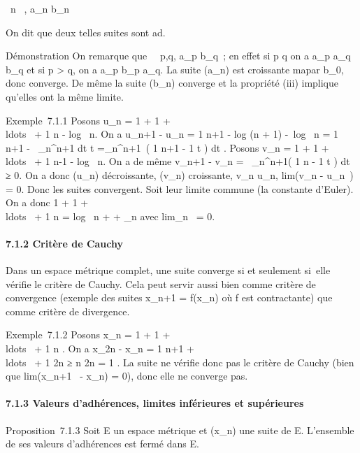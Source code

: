 \documentclass[]{article}
\begin{document}
\forall~n \in {}~, a\_n \leq \ell \leq b\_n~

On dit que deux telles suites sont ad\jmathacentes.

Démonstration On remarque que \forall~~p,q,
a\_p \leq b\_q~; en effet si p \leq q on a a\_p \leq
a\_q \leq b\_q et si p \textgreater{} q, on a a\_p
\leq b\_p \leq a\_q. La suite (a\_n) est croissante
ma par b\_0, donc converge. De même la suite (b\_n)
converge et la propriété (iii) implique qu'elles ont la même limite.

Exemple~7.1.1 Posons u\_n = 1 + 1  +
\\ldots~ + 1
\over n - log~ n. On a
u\_n+1 - u\_n = 1 \over n+1
- log (n + 1) -\ log~
n = 1 \over n+1 -\int ~
\_n^n+1 dt \over t
=\int  \_n^n+1~( 1
\over n+1 - 1 \over t ) dt .
Posons v\_n = 1 + 1  +
\\ldots~ + 1
\over n-1 - log~ n. On a de
même v\_n+1 - v\_n =\int ~
\_n^n+1( 1 \over n - 1
\over t ) dt ≥ 0. On a donc (u\_n)
décroissante, (v\_n) croissante, v\_n \leq u\_n,
lim(v\_n - u\_n~) = 0. Donc les
suites convergent. Soit \gamma leur limite commune (la constante d'Euler). On
a donc 1 + 1  +
\\ldots~ + 1
\over n = log~ n + \gamma +
\epsilon\_n avec lim\epsilon\_n~ = 0.

\paragraph{7.1.2 Critère de Cauchy}

Dans un espace métrique complet, une suite converge si et seulement
si~elle vérifie le critère de Cauchy. Cela peut servir aussi bien comme
critère de convergence (exemple des suites x\_n+1 =
f(x\_n) où f est contractante) que comme critère de divergence.

Exemple~7.1.2 Posons x\_n = 1 + 1  +
\\ldots~ + 1
\over n . On a x\_2n - x\_n = 1
\over n+1 +
\\ldots~ + 1
\over 2n ≥ n  \over 2n = 1
 . La suite ne vérifie donc pas le critère de
Cauchy (bien que lim(x\_n+1~ -
x\_n) = 0), donc elle ne converge pas.

\paragraph{7.1.3 Valeurs d'adhérences, limites inférieures et
supérieures}

Proposition~7.1.3 Soit E un espace métrique et (x\_n) une suite
de E. L'ensemble de ses valeurs d'adhérences est fermé dans E.
\end{document}
